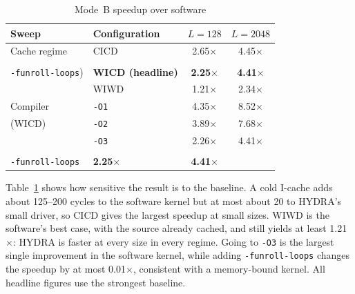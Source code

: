 \documentclass[conference]{IEEEtran}
\begin{document}
        \begin{table}[h]
        \caption{Mode~B speedup over software}
        \label{tab:modeB}
        \centering
        \begin{tabular}{llcc}
        \hline
        \textbf{Sweep} & \textbf{Configuration} & $L = 128$ & $L = 2048$ \\
        \hline
            Cache regime  & CICD                            & 2.65$\times$ & 4.45$\times$ \\
            \makecell[l]{(\texttt{-O3 \textbackslash}\\
            \texttt{-funroll-loops})}                       & \textbf{WICD (headline)} &                                                             \textbf{2.25$\times$} &                                                                \textbf{4.41$\times$} \\
                          & WIWD                            & 1.21$\times$ & 2.34$\times$ \\
        \hline
            Compiler      & \texttt{-O1}                    & 4.35$\times$ & 8.52$\times$ \\
            (WICD)        & \texttt{-O2}                    & 3.89$\times$ & 7.68$\times$ \\
                          & \texttt{-O3}                    & 2.26$\times$ & 4.41$\times$ \\
                          & \makecell[l]{\texttt{-O3 \textbackslash} 
                            \\\texttt{-funroll-loops}}     
                                                            & \textbf{2.25$\times$} & \textbf{4.41$\times$} \\
        \hline
        \end{tabular}
        \end{table}

        Table~\ref{tab:modeB} shows how sensitive the result is to the
        baseline. A cold I-cache adds about 125--200 cycles to the software
        kernel but at most about 20 to HYDRA's small driver, so CICD gives
        the largest speedup at small sizes. WIWD is the software's best
        case, with the source already cached, and still yields at least
        1.21$\times$: HYDRA is faster at every size in every regime. Going
        to \texttt{-O3} is the largest single improvement in the software
        kernel, while adding \texttt{-funroll-loops} changes the speedup by
        at most 0.01$\times$, consistent with a memory-bound kernel. All
        headline figures use the strongest baseline.
\end{document}
